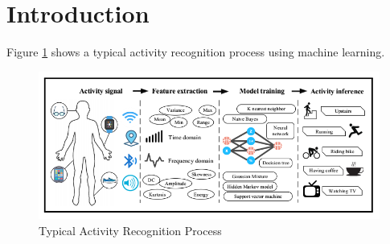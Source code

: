 \section{Introduction}

Figure \ref{fig:process} shows a typical activity recognition process using machine learning.

\begin{figure}[!ht]
    \centering
    \includegraphics[scale=0.5]{figures/HARML.png}
    \caption{Typical Activity Recognition Process}
    \label{fig:process}
\end{figure}